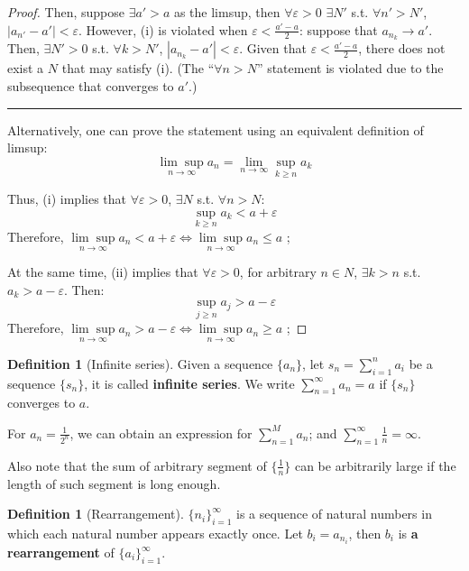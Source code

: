 \documentclass[12pt]{article}
\theoremstyle{definition}
\newtheorem{definition}[theorem]{Definition}
\theoremstyle{plain}
\begin{document}
\begin{proof}
    Then, suppose $\exists a' > a$ as the limsup, then $\forall \varepsilon > 0$
    $\exists N' $ s.t. $\forall n' > N'$, $|a_{n'} - a'| < \varepsilon$.
    However, (i) is violated when $\varepsilon < \frac{a' - a}{2}$: suppose that
    $a_{n_k} \to a'$. Then, $\exists N' > 0$ s.t. $\forall k > N'$, $|a_{n_k} - a'| <
    \varepsilon$. Given that $\varepsilon < \frac{a'-a}{2}$, there does not
    exist a $N$ that may satisfy (i). (The ``$\forall n > N$'' statement is
    violated due to the subsequence that converges to $a'$.)
    \noindent\rule{\textwidth}{1pt} %

    Alternatively, one can prove the statement using an equivalent definition of
    limsup:
    \[
        \underset{n \to \infty} {\lim\sup} a_n = \lim_{n\to\infty} \sup_{k \ge
        n} a_k
    \]

    Thus, (i) implies that $\forall \varepsilon > 0$, $\exists N$ s.t. $\forall
    n > N$:
    \[
        \sup_{k\ge n} a_k < a + \varepsilon
    \]
    Therefore, $\underset{n \to \infty} {\lim\sup} a_n < a + \varepsilon \iff
    \underset{n \to \infty} {\lim\sup} a_n \le a$ ;

    At the same time, (ii) implies that $\forall \varepsilon > 0$, for arbitrary
    $n \in N$, $\exists k > n$ s.t. $a_k > a - \varepsilon$. Then:
    \[
        \sup_{j\ge n} a_j > a - \varepsilon
    \]
    Therefore, $\underset{n \to \infty} {\lim\sup} a_n > a - \varepsilon \iff
    \underset{n \to \infty} {\lim\sup} a_n \ge a$ ;
\end{proof}

\begin{definition}
    [Infinite series]
    Given a sequence $\{a_n\}$, let $s_n = \sum_{i=1}^n a_i$ be a sequence
    $\{s_n\}$, it is called \textbf{infinite series}.
    We write $\sum_{n=1}^\infty a_n = a$ if $\{s_n\}$ converges to $a$.
    \begin{example}
        For $a_n = \frac{1}{2^n}$, we can obtain an expression for $\sum_{n=1}^M
        a_n$;
        and $\sum_{n=1}^\infty \frac{1}{n} = \infty$.

        Also note that the sum of arbitrary segment of $\{\frac{1}{n}\}$ can be
        arbitrarily large if the length of such segment is long enough.
    \end{example}
\end{definition}

\begin{definition}
    [Rearrangement]
    $\{n_i\}_{i=1}^\infty$ is a sequence of natural numbers in which each
    natural number appears exactly once. Let $b_i = a_{n_i}$, then $b_i$ is
    \textbf{a rearrangement } of $\{a_i\}_{i=1}^\infty$.
\end{definition}
\end{document}
